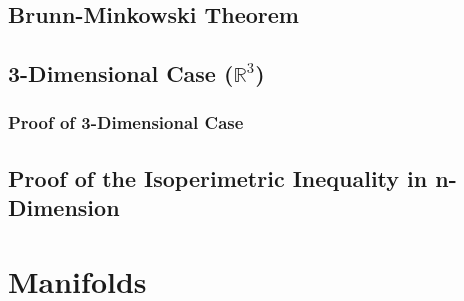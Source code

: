 \documentclass[a4paper]{book}
\begin{document}
\section{Brunn-Minkowski Theorem}
\section{3-Dimensional Case ($\mathbb{R}^3$)}
\subsection{Proof of 3-Dimensional Case}
\section{Proof of the Isoperimetric Inequality in n-Dimension}

\chapter{Manifolds}



\end{document}
